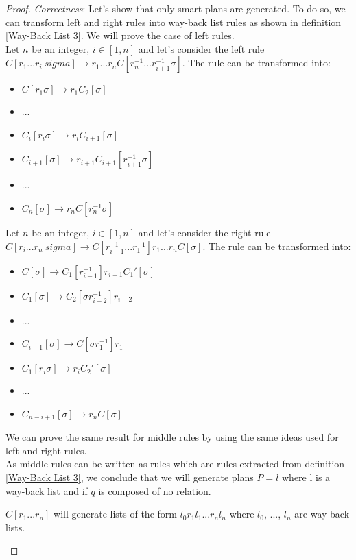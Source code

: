 \documentclass[10pt,a4paper,draft]{article}
\begin{document}
\begin{proof}
\textit{Correctness}: Let's show that only smart plans are generated. To do so, we can transform left and right rules into way-back list rules as shown in definition \ref{Way-Back List 3}. We will prove the case of left rules.\\
Let $n$ be an integer, $i \in [1, n]$ and let's consider the left rule $C[r_1...r_i \ sigma] \rightarrow r_1 ... r_n C[r_n^{-1} ... r_{i+1}^{-1} \sigma]$. The rule can be transformed into:
\begin{itemize}
\item $C[r_1 \sigma] \rightarrow r_1 C_2[\sigma]$
\item ...
\item $C_i[r_i \sigma] \rightarrow r_i C_{i+1}[\sigma]$
\item $C_{i+1}[\sigma] \rightarrow r_{i+1} C_{i+1}[r_{i+1}^{-1} \sigma]$
\item ...
\item $C_n[\sigma] \rightarrow r_n C[r_n^{-1} \sigma]$
\end{itemize}
Let $n$ be an integer, $i \in [1, n]$ and let's consider the right rule $C[r_i...r_n \ sigma] \rightarrow C[r_{i-1}^{-1} ... r_{1}^{-1}] r_1 ... r_n C[\sigma]$. The rule can be transformed into:
\begin{itemize}
\item $C[\sigma] \rightarrow C_1[r_{i-1}^{-1}] r_{i-1} C_1'[\sigma]$
\item $C_1[\sigma] \rightarrow C_2[\sigma r_{i-2}^{-1}] r_{i-2}$
\item ...
\item $C_{i-1}[\sigma] \rightarrow C[\sigma r_1^{-1}] r_1$
\item $C_1[r_i \sigma] \rightarrow r_i C_2'[\sigma]$
\item ...
\item $C_{n - i + 1}[\sigma] \rightarrow r_n C[\sigma]$
\end{itemize}
We can prove the same result for middle rules by using the same ideas used for left and right rules.\\
As middle rules can be written as rules which are rules extracted from definition \ref{Way-Back List 3}, we conclude that we will generate plans $P = l$ where l is a way-back list and if $q$ is composed of no relation.

\begin{lemma}
\label{formWordsGrammar}
$C[r_1 ... r_n]$ will generate lists of the form $l_0 r_1 l_1 ... r_n l_n$ where $l_0$, ..., $l_n$ are way-back lists.
\end{lemma}


\end{proof}
\end{document}
